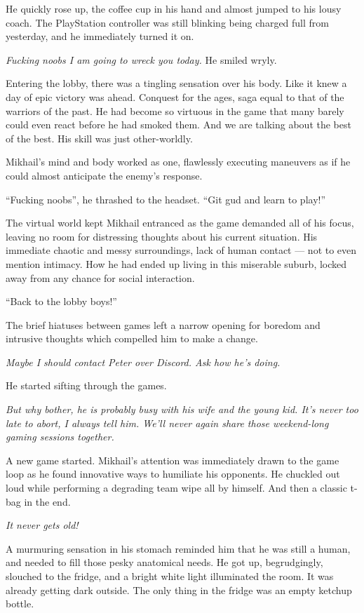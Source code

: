 He quickly rose up, the coffee cup in his hand and almost jumped to his lousy coach. The PlayStation controller was still blinking being charged full from yesterday, and he immediately turned it on.

\textit{Fucking noobs I am going to wreck you today.} He smiled wryly.

Entering the lobby, there was a tingling sensation over his body. Like it knew a day of epic victory was ahead. Conquest for the ages, saga equal to that of the warriors of the past. He had become so virtuous in the game that many barely could even react before he had smoked them. And we are talking about the best of the best. His skill was just other-worldly.

Mikhail’s mind and body worked as one, flawlessly executing maneuvers as if he could almost anticipate the enemy’s response.

“Fucking noobs”, he thrashed to the headset. “Git gud and learn to play!”

The virtual world kept Mikhail entranced as the game demanded all of his focus, leaving no room for distressing thoughts about his current situation. His immediate chaotic and messy surroundings, lack of human contact — not to even mention intimacy. How he had ended up living in this miserable suburb, locked away from any chance for social interaction.

“Back to the lobby boys!”

The brief hiatuses between games left a narrow opening for boredom and intrusive thoughts which compelled him to make a change. 

\textit{Maybe I should contact Peter over Discord. Ask how he's doing.}

He started sifting through the games.

\textit{But why bother, he is probably busy with his wife and the young kid. It’s never too late to abort, I always tell him. We’ll never again share those weekend-long gaming sessions together.}

A new game started. Mikhail’s attention was immediately drawn to the game loop as he found innovative ways to humiliate his opponents. He chuckled out loud while performing a degrading team wipe all by himself. And then a classic t-bag in the end.

\textit{It never gets old! }

A murmuring sensation in his stomach reminded him that he was still a human, and needed to fill those pesky anatomical needs. He got up, begrudgingly, slouched to the fridge, and a bright white light illuminated the room. It was already getting dark outside. The only thing in the fridge was an empty ketchup bottle.

